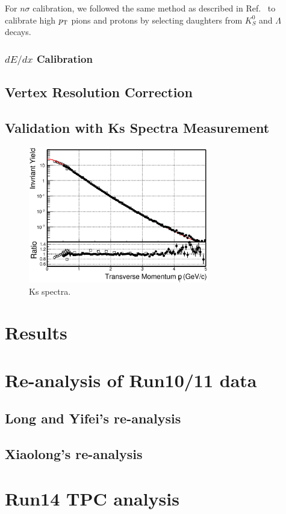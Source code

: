 \documentclass[a4paper]{article}
\begin{document}
For $n\sigma$ calibration, we followed the same method as described in Ref.~\cite{Xu:2008th} to calibrate high $p_{\rm T}$ pions and protons by selecting daughters from $K_{S}^0$ and $\Lambda$ decays.

\subsubsection{$dE/dx$ Calibration}



\subsection{Vertex Resolution Correction}

\subsection{Validation with Ks Spectra Measurement}

\begin{figure}
\centering
\includegraphics[width=0.7\textwidth]{fig/Ks_spectra_PtCut_0.eps}
\caption{\label{fig:Ks_spectra}Ks spectra.}
\end{figure}

\section{\label{results}Results}

\section{\label{Run1011}Re-analysis of Run10/11 data}

\subsection{Long and Yifei's re-analysis}

\subsection{Xiaolong's re-analysis}

\section{\label{Run14TPC}Run14 TPC analysis}



\end{document}
